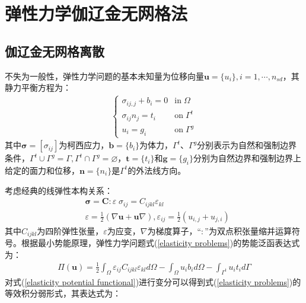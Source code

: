 \chapter{弹性力学伽辽金无网格法}
\section{伽辽金无网格离散}
不失为一般性，弹性力学问题的基本未知量为位移向量$\pmb{u}=\{u_i\},i=1,\dotsb,n_{sd}$，其静力平衡方程为：
\begin{equation}\label{elasticity problems}
\begin{split}
\begin{cases}
    \sigma_{ij,j}+b_i=0&\text{in}\;\Omega\\
    \sigma_{ij}n_j=t_i&\text{on}\;\Gamma^t\\
    u_i=g_i&\text{on}\;\Gamma^g
\end{cases}
\end{split}
\end{equation}
其中$\pmb \sigma=[\sigma_{ij}]$为柯西应力，$\pmb{b}=\{b_i\}$为体力，$\Gamma^t \text{、}\Gamma^g$分别表示为自然和强制边界条件，$\Gamma^t\cup \Gamma^g=\Gamma,\Gamma^t\cap \Gamma^g=\varnothing$，$\pmb{t}=\{t_i\}$和$\pmb{g}=\{g_i\}$分别为自然边界和强制边界上给定的面力和位移，$\pmb{n}=\{n_i\}$是$\Gamma^{t}$的外法线方向。\par
考虑经典的线弹性本构关系：
\begin{equation}\label{constitutive relation}
\begin{split}
        &\pmb{\sigma}=\pmb{C}\pmb{:}\varepsilon\;\sigma_{ij}=C_{ijkl}\varepsilon_{kl}\\
        &\varepsilon=\frac{1}{2}(\nabla \pmb{u}+\pmb{u}\nabla),\varepsilon_{ij}=\frac{1}{2}(u_{i,j}+u_{j,i})
\end{split}
\end{equation}
其中$C_{ijkl}$为四阶弹性张量，$\varepsilon$为应变，$\nabla$为梯度算子，“$\pmb{:}$”为双点积张量缩并运算符号。根据最小势能原理，弹性力学问题式(\ref{elasticity problems})的势能泛函表达式为：
\begin{equation}\label{elasticity potential functional}
\begin{split}
    \Pi(\pmb{u})=\frac{1}{2}\int_{\Omega}\varepsilon_{ij}C_{ijkl}\varepsilon_{kl}d\Omega-\int_{\Omega}u_ib_id\Omega-\int_{\Gamma^t}u_it_id\Gamma
\end{split}
\end{equation}
对式(\ref{elasticity potential functional})进行变分可以得到式(\ref{elasticity problems})的等效积分弱形式，其表达式为：
